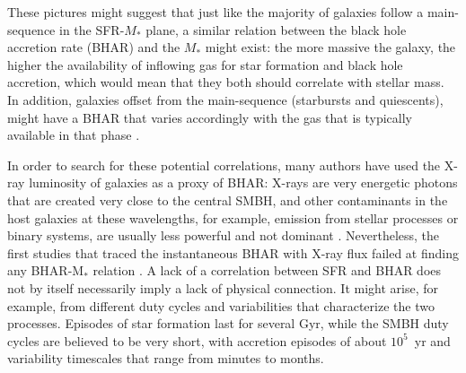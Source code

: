     These pictures might suggest that just like the majority of galaxies follow a main-sequence in the SFR-$M_*$ plane, a similar relation between the black hole accretion rate (BHAR) and the $M_*$ might exist: the more massive the galaxy, the higher the availability of inflowing gas for star formation and black hole accretion, which would mean that they both should correlate with stellar mass. In addition, galaxies offset from the main-sequence (starbursts and quiescents), might have a BHAR that varies accordingly with the gas that is typically available in that phase \citep{2019ApJ...877L..38R}. 
    
    In order to search for these potential correlations, many authors have used the X-ray luminosity of galaxies as a proxy of BHAR: X-rays are very energetic photons that are created very close to the central SMBH, and other contaminants in the host galaxies at these wavelengths, for example, emission from stellar processes or binary systems, are usually less powerful and not dominant \citep[e.g.][]{2015A&ARv..23....1B}. Nevertheless, the first studies that traced the instantaneous BHAR with X-ray flux failed at finding any BHAR-M$_*$ relation \citep{2009ApJ...696..396S, 2010A&A...518L..26S, 2012MNRAS.419...95M, 2012A&A...545A..45R, 2015ApJ...806..187A}. A lack of a correlation between SFR and BHAR does not by itself necessarily imply a lack of physical connection. It might arise, for example, from different duty cycles and variabilities that characterize the two processes.  
    Episodes of star formation last for several Gyr, while the SMBH duty cycles are believed to be very short, with accretion episodes of about $10^5$~yr and variability timescales that range from minutes to months.
    
